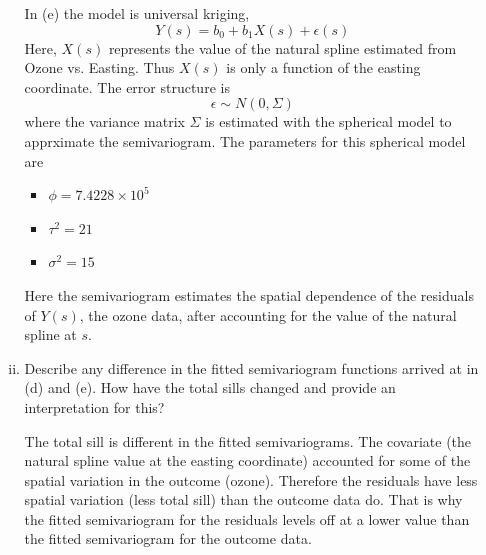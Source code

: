 \documentclass[letterpaper, 12pt]{article}\usepackage[]{graphicx}\usepackage[]{color}
\begin{document}
\begin{enumerate}[a.]
\begin{enumerate}[(i)]
{In (e) the model is universal kriging,
\[
Y(s) = b_0 + b_1 X(s) + \epsilon(s)
\]
Here, $X(s)$ represents the value of the natural spline estimated from Ozone vs. Easting. Thus $X(s)$ is only a function of the easting coordinate. The error structure is 
\[
\epsilon \sim N(0, \Sigma)
\]
where the variance matrix $\Sigma$ is estimated with the spherical model to apprximate the semivariogram. The parameters for this spherical model are
\begin{itemize}
\item
$\phi = \ensuremath{7.4228\times 10^{5}}$
\item
$\tau^2 = 21$
\item
$\sigma^2 = 15$
\end{itemize}
Here the semivariogram estimates the spatial dependence of the residuals of $Y(s)$, the ozone data, after accounting for the value of the natural spline at $s$.
}
\item
Describe any difference in the fitted semivariogram functions arrived at in (d) and (e). 
How have the total sills changed and provide an interpretation for this?

{\sf
The total sill is different in the fitted semivariograms. The covariate (the natural spline value at the easting coordinate) accounted for some of the spatial variation in the outcome (ozone). Therefore the residuals have less spatial variation (less total sill) than the outcome data do. That is why the fitted semivariogram for the residuals levels off at a lower value than the fitted semivariogram for the outcome data.
}
\end{enumerate}
\end{enumerate}
\end{document}

